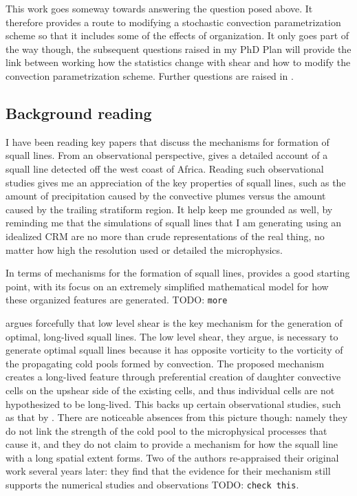 \documentclass[11pt,a4paper]{article}
\newcommand{\todo}{TODO: \texttt}
\begin{document}
This work goes someway towards answering the question posed above. It therefore provides a route to modifying a stochastic convection parametrization scheme so that it includes some of the effects of organization. It only goes part of the way though, the subsequent questions raised in my PhD Plan will provide the link between working how the statistics change with shear and how to modify the convection parametrization scheme. Further questions are raised in \cite{muetz2017effects}. 

\subsection{Background reading}

I have been reading key papers that discuss the mechanisms for formation of squall lines. From an observational perspective, \cite{houze1977} gives a detailed account of a squall line detected off the west coast of Africa. Reading such observational studies gives me an appreciation of the key properties of squall lines, such as the amount of precipitation caused by the convective plumes versus the amount caused by the trailing stratiform region. It help keep me grounded as well, by reminding me that the simulations of squall lines that I am generating using an idealized CRM are no more than crude representations of the real thing, no matter how high the resolution used or detailed the microphysics.

In terms of mechanisms for the formation of squall lines, \cite{TMM} provides a good starting point, with its focus on an extremely simplified mathematical model for how these organized features are generated. \todo{more}

\cite{RKW1988} argues forcefully that low level shear is the key mechanism for the generation of optimal, long-lived squall lines. The low level shear, they argue, is necessary to generate optimal squall lines because it has opposite vorticity to the vorticity of the propagating cold pools formed by convection. The proposed mechanism creates a long-lived feature through preferential creation of daughter convective cells on the upshear side of the existing cells, and thus individual cells are not hypothesized to be long-lived. This backs up certain observational studies, such as that by \cite{houze}. There are noticeable absences from this picture though: namely they do not link the strength of the cold pool to the microphysical processes that cause it, and they do not claim to provide a mechanism for how the squall line with a long spatial extent forms. Two of the authors re-appraised their original work several years later: they find that the evidence for their mechanism still supports the numerical studies and observations \todo{check this}.
\end{document}
